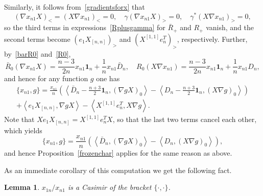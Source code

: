 \documentclass{amsart}
\newtheorem{lemma}[theorem]{Lemma}
\theoremstyle{definition}
\theoremstyle{remark}
\numberwithin{equation}{section}
\numberwithin{theorem}{section}
\def\one{\mathbf 1}
\def\Poi{{\{{\cdot},{\cdot}\}}}
\begin{document}
Similarly, it follows from~\eqref{gradientsforx} that
\[
(\nabla x_{n1}X)_<=(X\nabla x_{n1})_<=0,\quad \gamma(\nabla x_{n1}X)_>=0,
\quad \gamma^*(X\nabla x_{n1})_>=0,
\]
so the third terms in expressions~\eqref{Rplusgamma} for $\bar R_+$ and $R_+$ vanish, and the second terms
become $(e_1X_{[n,n]})_>$ and $(X^{[1,1]}e_n^T)_>$, respectively. Further, by~\eqref{barR0} and~\eqref{R0}, 
\[
\bar R_0(\nabla x_{n1}X)=\frac{n-3}{2n}x_{n1}\one_n+\frac1n x_{n1}\bar D_n,\quad
R_0(X\nabla x_{n1})=\frac{n-3}{2n}x_{n1}\one_n+\frac1n x_{n1}D_n,
\]
and hence for any function $g$ one has 
\begin{multline*}
\{x_{n1},g\}=\frac{x_{n1}}n\left(\left\langle \bar D_n-\frac{n+3}2\one_n, (\nabla g X)_0\right\rangle-
\left\langle D_n-\frac{n+3}2\one_n, (X\nabla g)_0 \right\rangle\right)\\+
\left\langle e_1X_{[n,n]},\nabla g X\right\rangle-\left\langle X^{[1,1]}e_n^T,X\nabla g\right\rangle.
\end{multline*}
Note that $Xe_1X_{[n,n]}=X^{[1,1]}e_n^TX$, so that the last two terms cancel each other, which yields
\begin{equation}\label{xn1sigizmund}
\{x_{n1},g\}=\frac{x_{n1}}n\left(\left\langle \bar D_n, (\nabla g X)_0\right\rangle-\left\langle D_n,(X\nabla g)_0 \right\rangle\right),
\end{equation}
 and hence Proposition~\ref{frozenchar} applies for the same reason as above. 

As an immediate corollary of this computation we get the following fact.

\begin{lemma}\label{xn1/x1n}
 $x_{1n}/x_{n1}$ is a Casimir of the bracket $\Poi$.
\end{lemma}
\end{document}
